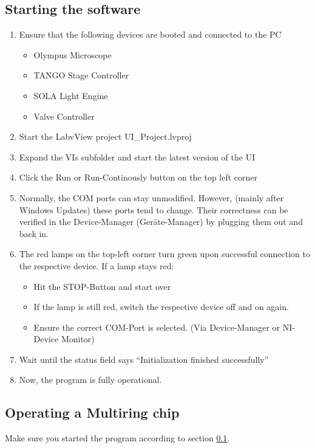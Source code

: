 \documentclass{article}
\begin{document}
\subsection{Starting the software}
\label{sec:software_start}
\begin{enumerate}
	\item Ensure that the following devices are booted and connected to the PC
	\begin{itemize}
		\item Olympus Microscope
		\item TANGO Stage Controller
		\item SOLA Light Engine
		\item Valve Controller 
	\end{itemize}
	\item Start the LabvView project UI\_{}Project.lvproj
	\item Expand the VIs subfolder and start the latest version of the UI
	\item Click the Run or Run-Continously button on the top left corner
	\item Normally, the COM ports can stay unmodified. However, (mainly after Windows Updates) these ports tend to change. Their correctness can be verified in the Device-Manager (Geräte-Manager) by plugging them out and back in.
	\item The red lamps on the top-left corner turn green upon successful connection to the respective device.
	\subitem If a lamp stays red:
	\begin{itemize}
		\item Hit the STOP-Button and start over
		\item If the lamp is still red, switch the respective device off and on again.
		\item Ensure the correct COM-Port is selected. (Via Device-Manager or NI-Device Monitor)
	\end{itemize}

	\item Wait until the status field says ``Initialization finished successfully''
	\item 	Now, the program is fully operational.
\end{enumerate}



\subsection{Operating a Multiring chip}
Make sure you started the program according to section \ref{sec:software_start}.
\end{document}
